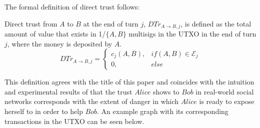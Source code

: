 \documentclass[11pt]{llncs}
\theoremstyle{definition}
\begin{document}
     The formal definition of direct trust follows:
     \begin{definition}
        Direct trust from $A$ to $B$ at the end of turn $j$, $DTr_{A \rightarrow B, j}$, is defined as the total amount of
        value that exists in 1/$\{A,B\}$ multisigs in the UTXO in the end of turn $j$, where the money is deposited by $A$.
        \begin{equation}
           DTr_{A \rightarrow B, j} =
              \begin{cases}
                 c_j\left(A, B\right), & if \left(A, B\right) \in \mathcal{E}_j \\
                 0, & else
              \end{cases}
        \end{equation}
     \end{definition}
     This definition agrees with the title of this paper and coincides with the intuition and experimental results of
     \cite{kmrs} that the trust $Alice$ shows to $Bob$ in real-world social networks corresponds with the extent
     of danger in which $Alice$ is ready to expose herself to in order to help $Bob$. An example graph with its corresponding
     transactions in the UTXO can be seen below.
\end{document}
